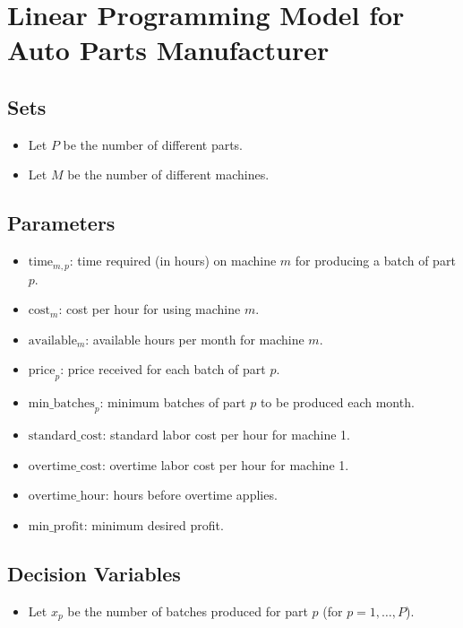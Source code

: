 \documentclass{article}
\begin{document}
\section*{Linear Programming Model for Auto Parts Manufacturer}

\subsection*{Sets}
\begin{itemize}
    \item Let \( P \) be the number of different parts.
    \item Let \( M \) be the number of different machines.
\end{itemize}

\subsection*{Parameters}
\begin{itemize}
    \item \( \text{time}_{m,p} \): time required (in hours) on machine \( m \) for producing a batch of part \( p \).
    \item \( \text{cost}_{m} \): cost per hour for using machine \( m \).
    \item \( \text{available}_{m} \): available hours per month for machine \( m \).
    \item \( \text{price}_{p} \): price received for each batch of part \( p \).
    \item \( \text{min\_batches}_{p} \): minimum batches of part \( p \) to be produced each month.
    \item \( \text{standard\_cost} \): standard labor cost per hour for machine 1.
    \item \( \text{overtime\_cost} \): overtime labor cost per hour for machine 1.
    \item \( \text{overtime\_hour} \): hours before overtime applies.
    \item \( \text{min\_profit} \): minimum desired profit.
\end{itemize}

\subsection*{Decision Variables}
\begin{itemize}
    \item Let \( x_{p} \) be the number of batches produced for part \( p \) (for \( p = 1, \ldots, P \)).
\end{itemize}
\end{document}
